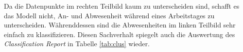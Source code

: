 Da die Datenpunkte im rechten Teilbild kaum zu unterscheiden sind, schafft es das Modell nicht, An- und Abwesenheit
während eines Arbeitstages zu unterscheiden. Währenddessen sind die Abwesenheiten im linken Teilbild sehr einfach
zu klassifizieren.
Diesen Sachverhalt spiegelt auch die Auswertung des \textit{Classification Report} in Tabelle \ref{tab:clus} wieder.\\

